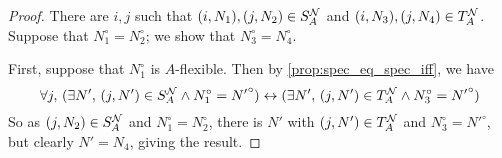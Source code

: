 \begin{proof}
  There are \( i, j \) such that \( (i, N_1), (j, N_2) \in S_A^{\mathcal N} \) and \( (i, N_3), (j, N_4) \in T_A^{\mathcal N} \).
  Suppose that \( N_1^\circ = N_2^\circ \); we show that \( N_3^\circ = N_4^\circ \).

  First, suppose that \( N_1^\circ \) is \( A \)-flexible.
  Then by \cref{prop:spec_eq_spec_iff}, we have
  \[ \forall j,\, (\exists N',\, (j, N') \in S_A^{\mathcal N} \wedge N_1^\circ = {N'}^\circ) \leftrightarrow (\exists N',\, (j, N') \in T_A^{\mathcal N} \wedge N_3^\circ = {N'}^\circ) \]
  So as \( (j, N_2) \in S_A^{\mathcal N} \) and \( N_1^\circ = N_2^\circ \), there is \( N' \) with \( (j, N') \in T_A^{\mathcal N} \) and \( N_3^\circ = {N'}^\circ \), but clearly \( N' = N_4 \), giving the result.


\end{proof}
